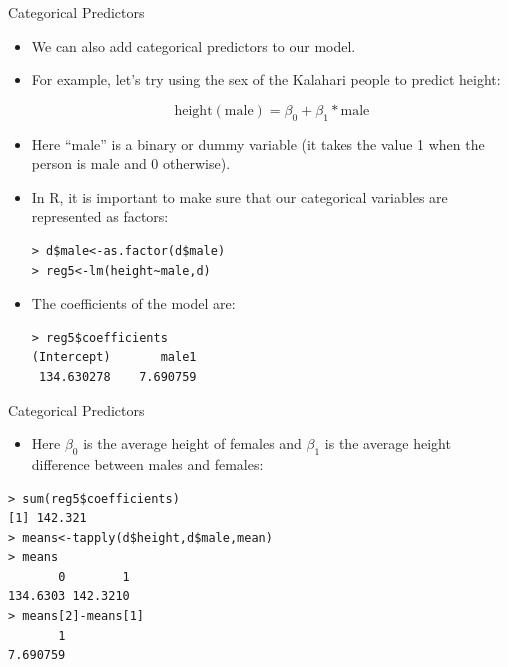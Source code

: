 \documentclass[handout]{beamer}
\begin{document}
\begin{frame}[fragile]{Categorical Predictors}
\scriptsize{ 
\begin{itemize}
 \item We can also add categorical predictors to our model. 
 
 \item For example, let's try using the sex of the Kalahari people to predict height: 


  \begin{displaymath}
  \text{height}(\text{male})=\beta_0+\beta_1*\text{male}
 \end{displaymath} 

 \item Here ``male'' is a binary or dummy variable (it takes the value 1 when the person is male and 0 otherwise).
 
 \item In R, it is important to make sure that our categorical variables are represented as factors:
 
 \begin{verbatim}
> d$male<-as.factor(d$male)
> reg5<-lm(height~male,d)
\end{verbatim}

\item The coefficients of the model are:

\begin{verbatim}
> reg5$coefficients
(Intercept)       male1 
 134.630278    7.690759  
\end{verbatim}


 
\end{itemize}





}
\end{frame}


\begin{frame}[fragile]{Categorical Predictors}
\scriptsize{ 
\begin{itemize}
\item Here $\beta_0$ is the average height of females and $\beta_1$ is the average height difference  between males and females:
 
\end{itemize}

\begin{verbatim}
> sum(reg5$coefficients)
[1] 142.321
> means<-tapply(d$height,d$male,mean)
> means
       0        1 
134.6303 142.3210
> means[2]-means[1]
       1 
7.690759 
\end{verbatim}



}
\end{frame}
\end{document}

